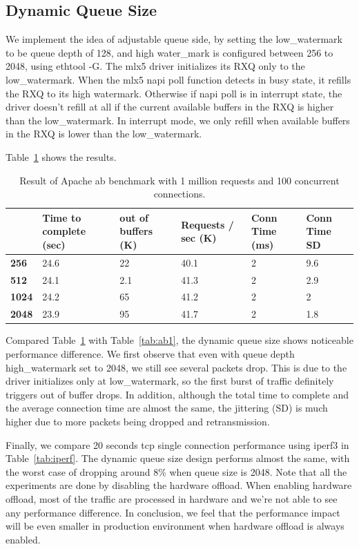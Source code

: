 \documentclass[letterpaper]{article}
\begin{document}
\subsection{Dynamic Queue Size}
We implement the idea of adjustable queue side, by setting the low\_watermark to
be queue depth of 128, and high water\_mark is configured between 256 to 2048, using
ethtool -G. The mlx5 driver initializes its RXQ only to the low\_watermark.
When the mlx5 napi poll function detects in busy state, it refills the
RXQ to its high watermark. Otherwise if napi poll is in interrupt state, the driver
doesn't refill at all if the current available buffers in the RXQ is higher than
the low\_watermark. In interrupt mode, we only refill when available buffers in the RXQ
is lower than the low\_watermark.

Table~\ref{tab:ab2} shows the results.
\begin{table}[h!]
\centering
\footnotesize
\begin{tabular}{|p{0.6cm}|p{1.2cm}|p{1.2cm}|p{1.2cm}|p{0.8cm}|p{1cm}|} \hline
\textbf{} & \textbf{Time to complete (sec)} & \textbf{out of buffers (K)} & \textbf{Requests / sec (K)} & \textbf{Conn Time (ms)} & \textbf{Conn Time SD} \\ \hline \hline
\textbf{256}  & 24.6  & 22   & 40.1 & 2 & 9.6 \\ \hline
\textbf{512}  & 24.1  & 2.1  & 41.3 & 2 & 2.9 \\ \hline
\textbf{1024} & 24.2  & 65   & 41.2 & 2 & 2   \\ \hline
\textbf{2048} & 23.9  & 95   & 41.7 & 2 & 1.8 \\ \hline
\end{tabular}
\caption{Result of Apache ab benchmark with 1 million requests and 100 concurrent connections.}
\label{tab:ab2}
\end{table}

Compared Table~\ref{tab:ab2} with Table~\ref{tab:ab1}, the dynamic queue size shows noticeable
performance difference. We first observe that even with queue depth high\_watermark set to 2048,
we still see several packets drop. This is due to the driver initializes only at low\_watermark,
so the first burst of traffic definitely triggers out of buffer drops.
In addition, although the total time to complete and the average connection time are almost the
same, the jittering (SD) is much higher due to more packets being dropped and retransmission.


Finally, we compare 20 seconds tcp single connection performance using iperf3 in Table~\ref{tab:iperf}. 
The dynamic queue size design performs almost the same, with the worst case of
dropping around 8\% when queue size is 2048.
Note that all the experiments are done by disabling the hardware offload.
When enabling hardware offload, most of the traffic are processed in hardware and
we're not able to see any performance difference.
In conclusion, we feel that the performance impact will be even smaller in production
environment when hardware offload is always enabled.
\end{document}
